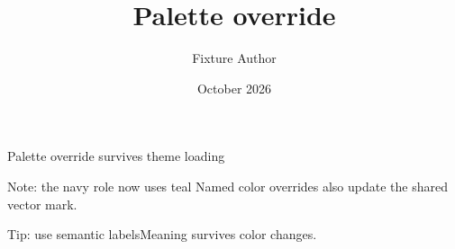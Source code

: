 \documentclass[11pt,aspectratio=43]{beamer}
\title{Palette override}
\author{Fixture Author}
\date{October 2026}
\begin{document}
\begin{frame}[plain]\titlepage\end{frame}
\begin{frame}{Palette override survives theme loading}
  \reportlogomark\par
  \begin{block}{Note: the navy role now uses teal}
    Named color overrides also update the shared vector mark.
  \end{block}
  \begin{exampleblock}{Tip: use semantic labels}Meaning survives color changes.\end{exampleblock}
\end{frame}
\end{document}
